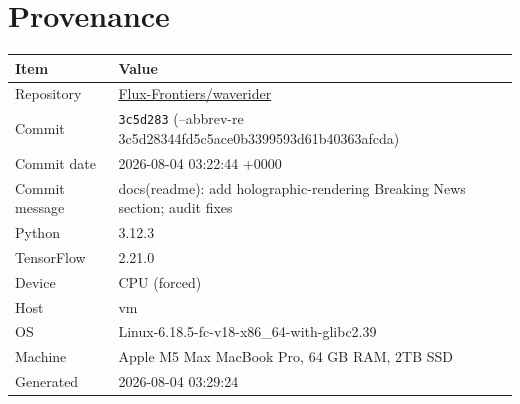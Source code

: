 \documentclass[11pt,letterpaper]{article}
\begin{document}
\section{Provenance}

\begin{tabular}{@{}ll@{}}
\toprule
\textbf{Item} & \textbf{Value} \\
\midrule
  Repository & \href{https://github.com/Flux-Frontiers/waverider}{Flux-Frontiers/waverider} \\
  Commit & \texttt{3c5d283} (--abbrev-re
3c5d28344fd5c5ace0b3399593d61b40363afcda) \\
  Commit date & 2026-08-04 03:22:44 +0000 \\
  Commit message & docs(readme): add holographic-rendering Breaking News section; audit fixes \\
  Python & 3.12.3 \\
  TensorFlow & 2.21.0 \\
  Device & CPU (forced) \\
  Host & vm \\
  OS & Linux-6.18.5-fc-v18-x86\_64-with-glibc2.39 \\
  Machine & Apple M5 Max MacBook Pro, 64 GB RAM, 2TB SSD \\
  Generated & 2026-08-04 03:29:24 \\
\bottomrule
\end{tabular}
\end{document}
